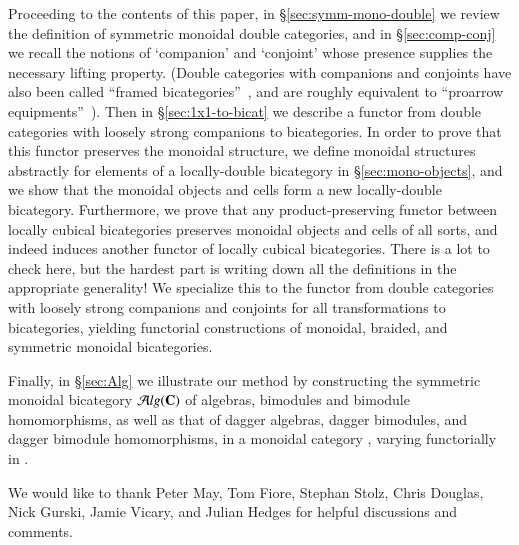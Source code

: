 Proceeding to the contents of this paper, in
\S\ref{sec:symm-mono-double} we review the definition of symmetric
monoidal double categories, and in \S\ref{sec:comp-conj} we recall the
notions of `companion' and `conjoint' whose presence supplies the
necessary lifting property.
(Double categories with companions and conjoints have also been called ``framed bicategories''~\cite{shulman:frbi}, and are roughly equivalent to ``proarrow equipments''~\cite{wood:proarrows-i}).
Then in \S\ref{sec:1x1-to-bicat} we describe a functor from double categories with loosely strong companions to bicategories.
In order to prove that this functor preserves the monoidal structure, we define monoidal structures abstractly for elements of a locally-double bicategory in \S\ref{sec:mono-objects}, and we show that the monoidal objects and cells form a new locally-double bicategory. Furthermore, we prove that any product-preserving functor between locally cubical bicategories preserves monoidal objects and cells of all sorts, and indeed induces another functor of locally cubical bicategories.
There is a lot to check here, but the hardest part is writing down all the definitions in the appropriate generality! We specialize this to the functor from double categories with loosely strong companions and conjoints for all transformations to bicategories, yielding functorial constructions of monoidal, braided, and symmetric monoidal bicategories.


Finally, in \S\ref{sec:Alg} we illustrate our method by constructing the symmetric monoidal bicategory ${\mathcal{A}}lg(\mathbf{C})$ of algebras, bimodules and bimodule homomorphisms, as well as that of dagger algebras, dagger bimodules, and dagger bimodule homomorphisms, in a monoidal category \bC, varying functorially in \bC.

We would like to thank Peter May, Tom Fiore, Stephan Stolz, Chris
Douglas, Nick Gurski, Jamie Vicary, and Julian Hedges for helpful discussions and comments.

